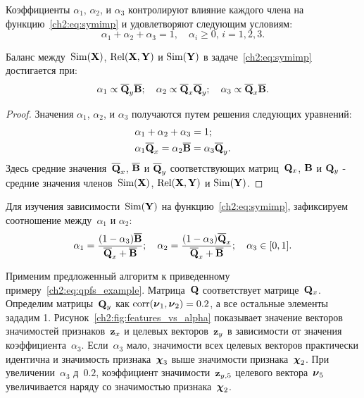 Коэффициенты $\alpha_1$, $\alpha_2$, и $\alpha_3$ контролируют влияние каждого члена на функцию~\eqref{ch2:eq:symimp} и удовлетворяют следующим условиям:
\begin{equation*}
\alpha_1 + \alpha_2 + \alpha_3 = 1, \quad \alpha_i \geq 0, \, i = 1, 2, 3.
\end{equation*}
\begin{statement}
	Баланс между~$\text{Sim}(\mathbf{X})$, $\text{Rel}(\mathbf{X}, \mathbf{Y})$ и $\text{Sim}(\mathbf{Y})$ в  задаче~\eqref{ch2:eq:symimp} достигается при:
	\begin{equation}
	\alpha_1 \propto \overline{\mathbf{Q}}_y \overline{\mathbf{B}} ; \quad
	\alpha_2 \propto \overline{\mathbf{Q}}_x \overline{\mathbf{Q}}_y; \quad
	\alpha_3  \propto \overline{\mathbf{Q}}_x \overline{\mathbf{B}}.
	\label{ch2:eq:alpha_3}
	\end{equation}
	
\end{statement}
\begin{proof}
	Значения $\alpha_1$, $\alpha_2$, и $\alpha_3$ получаются путем решения следующих уравнений:
	\begin{align*}
	&\alpha_1 + \alpha_2 + \alpha_3 = 1; \\
	&\alpha_1 \overline{\mathbf{Q}}_x = \alpha_2 \overline{\mathbf{B}} = \alpha_3 \overline{\mathbf{Q}}_y.
	\end{align*}
	Здесь средние значения~$\overline{\mathbf{Q}}_x$, $\overline{\mathbf{B}}$ и $\overline{\mathbf{Q}}_y$ соответствующих матриц~$\mathbf{Q}_x$, $\mathbf{B}$ и $\mathbf{Q}_y$ - средние значения членов~$\text{Sim}(\mathbf{X})$, $\text{Rel}(\mathbf{X}, \mathbf{Y})$ и $\text{Sim}(\mathbf{Y})$.
\end{proof}
Для изучения зависимости~$\text{Sim}(\mathbf{Y})$ на функцию~\eqref{ch2:eq:symimp}, зафиксируем соотношение между~$\alpha_1$ и $\alpha_2$:
\begin{equation}
\alpha_1 = \frac{(1 - \alpha_3)\overline{\mathbf{B}}}{\overline{\mathbf{Q}}_x + \overline{\mathbf{B}}}; \quad
\alpha_2 = \frac{(1 - \alpha_3)\overline{\mathbf{Q}}_x}{\overline{\mathbf{Q}}_x + \overline{\mathbf{B}}}; \quad
\alpha_3 \in [0, 1].
\label{ch2:eq:alphas3}
\end{equation}

Применим предложенный алгоритм к приведенному примеру~\eqref{ch2:eq:qpfs_example}.
Матрица~$\mathbf{Q}$ соответствует матрице~$\mathbf{Q}_x$.
Определим матрицы~$\mathbf{Q}_y$ как $\text{corr}(\boldsymbol{\nu}_1, \boldsymbol{\nu}_2) = 0.2$, а все остальные элементы зададим 1.
Рисунок~\ref{ch2:fig:features_vs_alpha} показывает значение векторов значимостей признаков~$\mathbf{z}_x$ и целевых векторов~$\mathbf{z}_y$ в зависимости от значения коэффициента~$\alpha_3$.
Если~$\alpha_3$ мало, значимости всех целевых векторов практически идентична и значимость признака~$\boldsymbol{\chi}_3$ выше значимости признака~$\boldsymbol{\chi}_2$. При увеличении~$\alpha_3$ д~$0.2$, коэффициент значимости~$\mathbf{z}_{y,5}$ целевого вектора~$\boldsymbol{\nu}_5$ увеличивается наряду со значимостью признака~$\boldsymbol{\chi}_2$.

